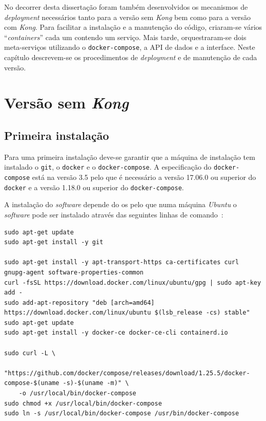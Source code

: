 No decorrer desta dissertação foram também desenvolvidos os mecanismos de \textit{deployment} necessários tanto para a versão sem \textit{Kong} bem como para a versão com \textit{Kong}. Para  facilitar  a  instalação  e  a  manutenção  do  código,  criaram-se  vários ``\textit{containers}'' cada um contendo um serviço. Mais tarde, orquestraram-se dois meta-serviços utilizando o \texttt{docker-compose}, a API de dados e a interface. Neste capítulo descrevem-se os procedimentos de \textit{deployment} e de manutenção de cada versão.

\section{Versão sem \textit{Kong}}\label{sec:deployNoKong}

\subsection{Primeira instalação}\label{sec:inst-prim}

Para uma primeira instalação deve-se garantir que a máquina de instalação tem instalado o \texttt{git}, o \texttt{docker} e o \texttt{docker-compose}. 
A especificação do \texttt{docker-compose} está  na versão 3.5 pelo que é necessário a versão 17.06.0 ou superior do \texttt{docker} e a versão 1.18.0 ou superior do \texttt{docker-compose}. 

A instalação do \textit{software} depende do \acrshort{os} pelo que numa máquina \textit{Ubuntu} o \textit{software} pode ser instalado através das seguintes linhas de comando~\cite{installDocker,installDC}:

\begin{lstlisting}[caption=Instalar \textit{docker} e \textit{docker-compose}]
sudo apt-get update
sudo apt-get install -y git

sudo apt-get install -y apt-transport-https ca-certificates curl gnupg-agent software-properties-common
curl -fsSL https://download.docker.com/linux/ubuntu/gpg | sudo apt-key add -
sudo add-apt-repository "deb [arch=amd64] https://download.docker.com/linux/ubuntu $(lsb_release -cs) stable"
sudo apt-get update
sudo apt-get install -y docker-ce docker-ce-cli containerd.io

sudo curl -L \
    "https://github.com/docker/compose/releases/download/1.25.5/docker-compose-$(uname -s)-$(uname -m)" \
    -o /usr/local/bin/docker-compose
sudo chmod +x /usr/local/bin/docker-compose
sudo ln -s /usr/local/bin/docker-compose /usr/bin/docker-compose
\end{lstlisting}

